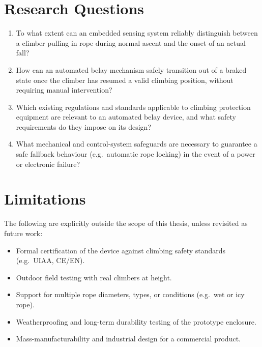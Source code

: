 \section{Research Questions}
\label{sec:research-questions}

\begin{enumerate}
    \item[\textbf{RQ1}] To what extent can an embedded sensing system
        reliably distinguish between a climber pulling in rope during
        normal ascent and the onset of an actual fall?
    \item[\textbf{RQ2}] How can an automated belay mechanism safely
        transition out of a braked state once the climber has resumed a
        valid climbing position, without requiring manual intervention?
    \item[\textbf{RQ3}] Which existing regulations and standards
        applicable to climbing protection equipment are relevant to an
        automated belay device, and what safety requirements do they
        impose on its design?
    \item[\textbf{RQ4}] What mechanical and control-system safeguards are
        necessary to guarantee a safe fallback behaviour (e.g.\ automatic
        rope locking) in the event of a power or electronic failure?
\end{enumerate}

\section{Limitations}
\label{sec:limitations}

The following are explicitly outside the scope of this thesis, unless
revisited as future work:

\begin{itemize}
    \item Formal certification of the device against climbing safety
        standards (e.g.\ UIAA, CE/EN).
    \item Outdoor field testing with real climbers at height.
    \item Support for multiple rope diameters, types, or conditions
        (e.g.\ wet or icy rope).
    \item Weatherproofing and long-term durability testing of the
        prototype enclosure.
    \item Mass-manufacturability and industrial design for a commercial
        product.
\end{itemize}

